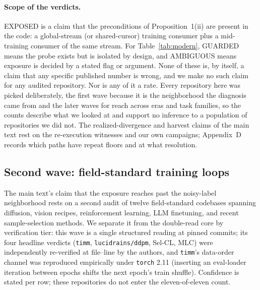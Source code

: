 \documentclass[10pt,letterpaper]{article}
\theoremstyle{remark}
\newcommand{\code}[1]{\texttt{#1}}
\begin{document}
\paragraph{Scope of the verdicts.}
EXPOSED is a claim that the preconditions of Proposition~1(ii) are present
in the code: a global-stream (or shared-cursor) training consumer plus a
mid-training consumer of the same stream. For Table~\ref{tab:modern},
GUARDED means the probe exists but is isolated by design, and AMBIGUOUS
means exposure is decided by a stated flag or argument. None of these is,
by itself, a claim
that any specific published number is wrong, and we make no such claim for
any audited repository. Nor is any of it a rate. Every repository here was
picked deliberately, the first wave because it is the neighborhood the
diagnosis came from and the later waves for reach across eras and task
families, so the counts describe what we looked at and support no inference
to a population of repositories we did not. The realized-divergence and harvest claims of the
main text rest on the re-execution witnesses and our own campaigns;
Appendix~D records which paths have repeat floors and at what resolution.

\subsection{Second wave: field-standard training loops}
\label{sec:audit-fieldwide}

The main text's claim that the exposure reaches past the noisy-label
neighborhood rests on a second audit of twelve field-standard codebases spanning
diffusion, vision recipes, reinforcement learning, LLM finetuning, and recent
sample-selection methods. We separate it from the double-read core by
verification tier: this wave is a single structured reading at pinned commits;
its four headline verdicts (\code{timm}, \code{lucidrains/ddpm},
Sel-CL, MLC) were independently re-verified at file--line by the authors, and
\code{timm}'s data-order channel was reproduced empirically under \code{torch}
2.11 (inserting an eval-loader iteration between epochs shifts the next epoch's
train shuffle). Confidence is stated per row; these repositories do not enter
the eleven-of-eleven count.
\end{document}
